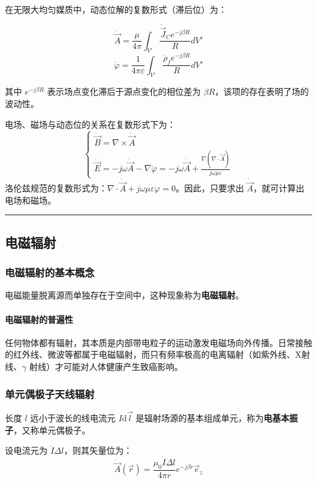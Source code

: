 在无限大均匀媒质中，动态位解的复数形式（滞后位）为：
\begin{formulaBox}
\[
\dot{\vec{A}} = \frac{\mu}{4\pi} \int_{V'} \frac{\dot{\vec{J}}_C e^{-j\beta R}}{R} dV'
\]
\[
\dot{\varphi} = \frac{1}{4\pi\varepsilon} \int_{V'} \frac{\dot{\rho}_f e^{-j\beta R}}{R} dV'
\]
\end{formulaBox}
其中 $e^{-j\beta R}$ 表示场点变化滞后于源点变化的相位差为 $\beta R$，该项的存在表明了场的波动性。

电场、磁场与动态位的关系在复数形式下为：
\[
\begin{cases}
\dot{\vec{B}} = \nabla \times \dot{\vec{A}} \\
\dot{\vec{E}} = -j\omega \dot{\vec{A}} - \nabla \dot{\varphi} = -j\omega \dot{\vec{A}} + \frac{\nabla(\nabla \cdot \dot{\vec{A}})}{j\omega\mu\varepsilon}
\end{cases}
\]
洛伦兹规范的复数形式为：$\nabla \cdot \dot{\vec{A}} + j\omega\mu\varepsilon \dot{\varphi} = 0$。因此，只要求出 $\dot{\vec{A}}$，就可计算出电场和磁场。

\vspace{0.8cm}\hrule\vspace{0.8cm}

\subsection{电磁辐射}
\subsubsection{电磁辐射的基本概念}
电磁能量脱离源而单独存在于空间中，这种现象称为\textbf{电磁辐射}。

\paragraph{电磁辐射的普遍性}
任何物体都有辐射，其本质是内部带电粒子的运动激发电磁场向外传播。日常接触的红外线、微波等都属于电磁辐射，而只有频率极高的电离辐射（如紫外线、X射线、$\gamma$ 射线）才可能对人体健康产生致癌影响。

\subsubsection{单元偶极子天线辐射}
长度 $l$ 远小于波长的线电流元 $I\mathrm{d}\vec{l}$ 是辐射场源的基本组成单元，称为\textbf{电基本振子}，又称单元偶极子。

设电流元为 $\dot{I}\Delta l$，则其矢量位为：
\[
\dot{\vec{A}}(\vec{r}) = \frac{\mu_0 \dot{I} \Delta l}{4\pi r} e^{-j\beta r} \vec{e}_z
\]

